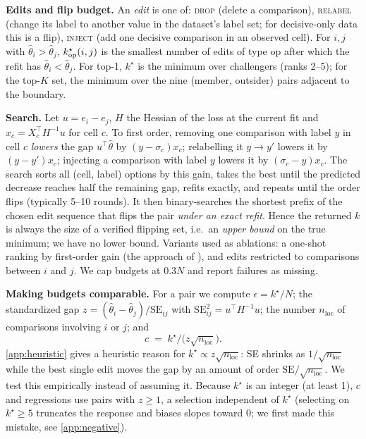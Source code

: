 \documentclass{article}
\theoremstyle{plain}
\theoremstyle{remark}
\newcommand{\nloc}{n_{\mathrm{loc}}}
\newcommand{\kstar}{k^\star}
\begin{document}
\textbf{Edits and flip budget.} An \emph{edit} is one of: \textsc{drop} (delete a comparison), \textsc{relabel} (change its label to another value in the dataset's label set; for decisive-only data this is a flip), \textsc{inject} (add one decisive comparison in an observed cell). For $i,j$ with $\hat\theta_i>\hat\theta_j$, $\kstar_{\rm op}(i,j)$ is the smallest number of edits of type op after which the refit has $\hat\theta_i<\hat\theta_j$. For top-1, $\kstar$ is the minimum over challengers (ranks 2--5); for the top-$K$ set, the minimum over the nine (member, outsider) pairs adjacent to the boundary.

\textbf{Search.} Let $u=e_i-e_j$, $H$ the Hessian of the loss at the current fit and $x_c=X_c^\top H^{-1}u$ for cell $c$. To first order, removing one comparison with label $y$ in cell $c$ \emph{lowers} the gap $u^\top\hat\theta$ by $(y-\sigma_c)x_c$; relabelling it $y\to y'$ lowers it by $(y-y')x_c$; injecting a comparison with label $y$ lowers it by $(\sigma_c-y)x_c$. The search sorts all (cell, label) options by this gain, takes the best until the predicted decrease reaches half the remaining gap, refits exactly, and repeats until the order flips (typically 5--10 rounds). It then binary-searches the shortest prefix of the chosen edit sequence that flips the pair \emph{under an exact refit}. Hence the returned $k$ is always the size of a verified flipping set, i.e.\ an \emph{upper bound} on the true minimum; we have no lower bound. Variants used as ablations: a one-shot ranking by first-order gain (the approach of \citealp{broderick2020}), and edits restricted to comparisons between $i$ and $j$. We cap budgets at $0.3N$ and report failures as missing.

\textbf{Making budgets comparable.} For a pair we compute $\epsilon=\kstar/N$; the standardized gap $z=(\hat\theta_i-\hat\theta_j)/\mathrm{SE}_{ij}$ with $\mathrm{SE}_{ij}^2=u^\top H^{-1}u$; the number $\nloc$ of comparisons involving $i$ or $j$; and
\begin{equation}
 c \;=\; \kstar\big/\bigl(z\sqrt{\nloc}\bigr).
\end{equation}
\cref{app:heuristic} gives a heuristic reason for $\kstar\propto z\sqrt{\nloc}$: SE shrinks as $1/\sqrt{\nloc}$ while the best single edit moves the gap by an amount of order $\mathrm{SE}/\sqrt{\nloc}$. We test this empirically instead of assuming it. Because $\kstar$ is an integer (at least 1), $c$ and regressions use pairs with $z\ge1$, a selection independent of $\kstar$ (selecting on $\kstar\ge5$ truncates the response and biases slopes toward 0; we first made this mistake, see \cref{app:negative}).
\end{document}
